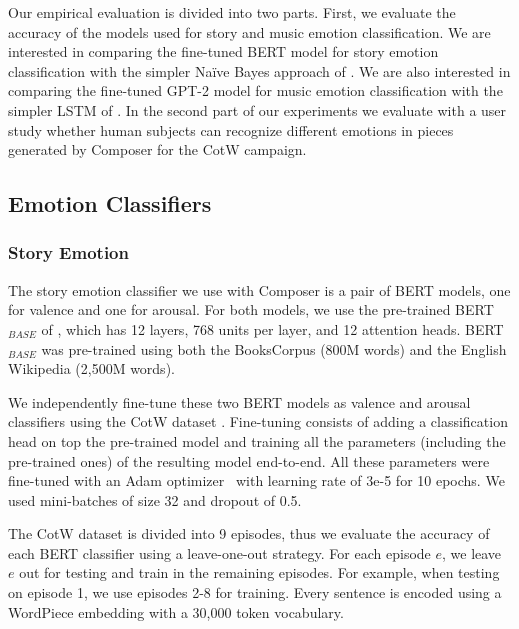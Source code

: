 Our empirical evaluation is divided into two parts. First, we evaluate the accuracy of the models used for story and music emotion classification. We are interested in comparing the fine-tuned BERT model for story emotion classification with the simpler Na\"ive Bayes approach of \cite{padovani2017}. We are also interested in comparing the fine-tuned GPT-2 model for music emotion classification with the simpler LSTM of \cite{ferreira_2019}. In the second part of our experiments we evaluate with a user study whether human subjects can recognize different emotions in pieces generated by Composer for the CotW campaign.


\subsection{Emotion Classifiers}

\subsubsection{Story Emotion}

The story emotion classifier we use with Composer is a pair of BERT models, one for valence and one for arousal. For both models, we use the pre-trained BERT$_{BASE}$ of \cite{devlin2018bert},
which has 12 layers, 768 units per layer, and 12 attention heads. BERT$_{BASE}$ was pre-trained using both the BooksCorpus (800M words) \cite{zhu2015aligning} and
the English Wikipedia (2,500M words).

We independently fine-tune these two BERT models as valence and arousal
classifiers using the CotW dataset \cite{padovani2017}. Fine-tuning consists of adding a
classification head on top the pre-trained model and training all the
parameters (including the pre-trained ones) of the resulting model
end-to-end. All these parameters were fine-tuned with an Adam optimizer~\cite{adam14} with learning rate of 3e-5 for 10 epochs. We used mini-batches of size 32 and dropout of 0.5.

The CotW dataset is divided into 9 episodes, thus we evaluate
the accuracy of each BERT classifier using a leave-one-out strategy.
For each episode $e$, we leave $e$ out for
testing and train in the remaining episodes. For example,
when testing on episode 1, we use episodes 2-8 for training.
Every sentence is encoded using a
WordPiece embedding \cite{wu2016google} with a 30,000 token vocabulary.

